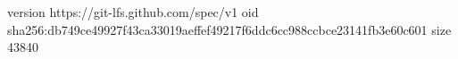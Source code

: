 version https://git-lfs.github.com/spec/v1
oid sha256:db749ce49927f43ca33019aeffef49217f6ddc6cc988ccbce23141fb3e60c601
size 43840
